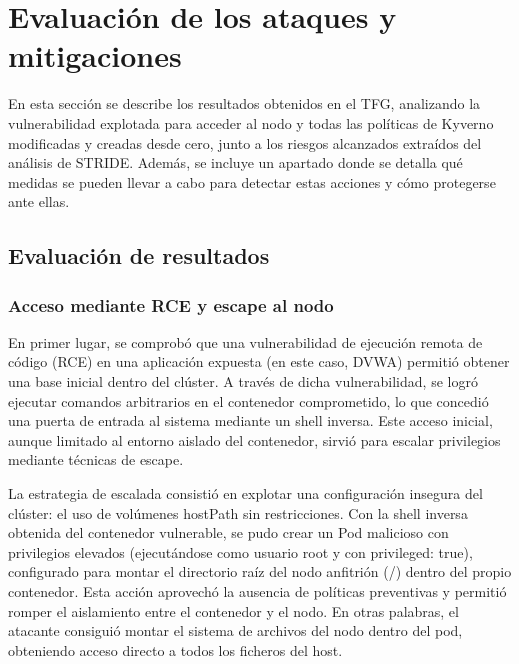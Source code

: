 \documentclass[12pt,twoside,titlepage]{report}
\begin{document}
\chapter{Evaluación de los ataques y mitigaciones}\label{chap:resultados}
\label{sec:resulObtenidos}


En esta sección se describe los resultados obtenidos en el TFG, analizando la vulnerabilidad explotada para acceder al nodo y todas las políticas de Kyverno modificadas y creadas desde cero, junto a los riesgos alcanzados extraídos del análisis de STRIDE. Además, se incluye un apartado donde se detalla qué medidas se pueden llevar a cabo para detectar estas acciones y cómo protegerse ante ellas.

\section{Evaluación de resultados}
\subsection{Acceso mediante RCE y escape al nodo}   
En primer lugar, se comprobó que una vulnerabilidad de ejecución remota de código (RCE) en una aplicación expuesta (en este caso, DVWA) permitió obtener una base inicial dentro del clúster. A través de dicha vulnerabilidad, se logró ejecutar comandos arbitrarios en el contenedor comprometido, lo que concedió una puerta de entrada al sistema mediante un shell inversa. Este acceso inicial, aunque limitado al entorno aislado del contenedor, sirvió para escalar privilegios mediante técnicas de escape. 

La estrategia de escalada consistió en explotar una configuración insegura del clúster: el uso de volúmenes hostPath sin restricciones. Con la shell inversa obtenida del contenedor vulnerable, se pudo crear un Pod malicioso con privilegios elevados (ejecutándose como usuario root y con privileged: true), configurado para montar el directorio raíz del nodo anfitrión (/) dentro del propio contenedor. Esta acción aprovechó la ausencia de políticas preventivas y permitió romper el aislamiento entre el contenedor y el nodo. En otras palabras, el atacante consiguió montar el sistema de archivos del nodo dentro del pod, obteniendo acceso directo a todos los ficheros del host. 
\end{document}

